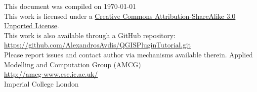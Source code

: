 \documentclass[11pt,a4paper,twoside,openany]{article}
\begin{document}
\thispagestyle{empty}
\begin{center}
This document was compiled on \today\\[30pt]
This work is licensed under a \href{http://creativecommons.org/licenses/by-sa/3.0/deed.en_GB}{Creative Commons Attribution-ShareAlike 3.0 Unported License}.\\[30pt]
This work is also available through a GitHub repository: \url{https://github.com/AlexandrosAvdis/QGISPluginTutorial.git}\\Please report issues and contact author via mechanisms available therein.
\vfill
{\footnotesize
Applied Modelling and Computation Group (AMCG)\\[10pt]
\url{http://amcg-www.ese.ic.ac.uk/}\\
Imperial College London}
\end{center}
\pagebreak

\setlength{\textwidth}{390pt}
\setlength{\textheight}{592pt}
\setlength{\topmargin}{-0.5in}
\setlength{\headsep}{10mm}
\setlength{\textheight}{240mm}
\setlength{\oddsidemargin}{4mm}
\setlength{\evensidemargin}{-4.mm}









%
%

\begin{appendices}

\end{appendices}
\end{document}
